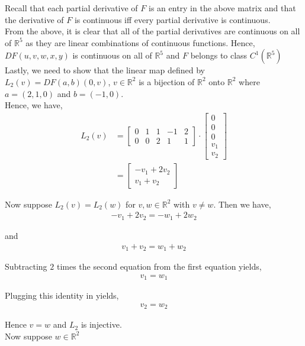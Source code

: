 \documentclass[12pt]{article}
\newenvironment{problem}[2][Problem]{\begin{trivlist}
\item[\hskip \labelsep {\bfseries #1}\hskip \labelsep {\bfseries #2.}]}{\end{trivlist}}
\begin{document}
Recall that each partial derivative of $F$ is an entry in the above matrix and that the derivative of $F$ is continuous iff every partial derivative is continuous.\\

From the above, it is clear that all of the partial derivatives are continuous on all of $\mathbb{R}^5$ as they are linear combinations of continuous functions. Hence, $DF(u, v, w, x, y)$ is continuous on all of $\mathbb{R}^5$ and $F$ belongs to class $C^1(\mathbb{R}^5)$\\

Lastly, we need to show that the linear map defined by $L_2(v) = DF(a, b)(0, v)$, $v \in \mathbb{R}^2$ is a bijection of $\mathbb{R}^2$ onto $\mathbb{R}^2$ where $a = (2, 1, 0)$ and $b = (-1, 0)$.\\

Hence, we have,
\begin{align*}
L_2(v) &= \begin{bmatrix}
0 & 1 & 1 & -1 & 2\\
0 & 0 & 2 & 1 & 1
\end{bmatrix} \cdot \begin{bmatrix}
0 \\ 0 \\ 0 \\ v_1 \\ v_2
\end{bmatrix}\\
&= \begin{bmatrix}
-v_1 + 2v_2 \\
v_1 + v_2
\end{bmatrix}
\end{align*}

Now suppose $L_2(v) = L_2(w)$ for $v, w \in \mathbb{R}^2$ with $v \neq w$. Then we have,
\begin{align*}
-v_1 + 2v_2 = -w_1 + 2w_2
\end{align*}

and 
\begin{align*}
v_1 + v_2 = w_1 + w_2
\end{align*}

Subtracting $2$ times the second equation from the first equation yields,
\begin{align*}
v_1 = w_1
\end{align*}

Plugging this identity in yields,
\begin{align*}
v_2 = w_2
\end{align*}

Hence $v = w$ and $L_2$ is injective.\\

Now suppose $w \in \mathbb{R}^2$
\begin{problem}{3}
\end{problem}

\begin{problem}{4}
\end{problem}

\begin{problem}{5}
\end{problem}
\end{document}
